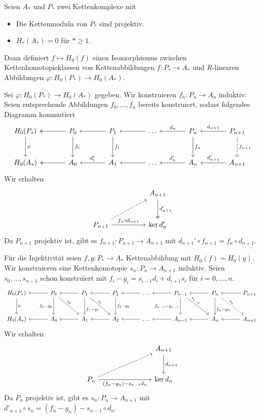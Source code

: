 \begin{proposition}[label=prop:113]
	Seien $A_*$ und $P_*$ zwei Kettenkomplexe mit 
	\begin{itemize}[itemsep=0pt]
		\item Die Kettenmoduln von $P_*$ sind projektiv.
		\item $H_*(A_*)=0$ für $*\ge 1$.
	\end{itemize}
	Dann definiert $f \mapsto H_0(f)$ einen Isomorphismus zwischen Kettenhomotopieklassen von Kettenabbildungen $f \colon P_* \to A_*$ und $R$-linearen Abbildungen $\varphi \colon H_0(P_*) \to H_0(A_*)$.
\end{proposition}
\begin{beweis}
	Sei $\varphi \colon H_0(P_*) \to H_0(A_*)$ gegeben. 
	Wir konstruieren $f_n \colon P_n \to A_n$ induktiv: 
	Seien entsprechende Abbildungen $f_0,\ldots ,f_n$ bereits konstruiert, sodass folgendes Diagramm kommutiert
	\[
		\begin{tikzcd}[sep=large]
			H_0(P_*) \dar["\varphi"] & P_0 \lar[two heads]  \dar["f_0"]& P_1 \lar  \dar["f_1"]& \ldots \lar & P_n \lar["d_n"']\dar["f_n"] & P_{n+1} \lar["d_{n+1}"'] \dar[dashed,"f_{n+1}"] \\
			H_0(A_*) & A_0 \lar[two heads] & A_1 \lar["d_1'"'] & \ldots \lar & A_n \lar["d_n'"'] & A_{n+1} \lar["d_{n+1}'"']
		\end{tikzcd}
	\]
	Wir erhalten 
	\[
		\begin{tikzcd}[row sep=large, column sep=huge]
			\mbox{ } & A_{n+1} \dar[two heads,"d_{n+1}'"]\\
			P_{n+1} \ar[ur,dashed] \rar["f_n \circ d_{n+1}"] & \ker d_{n}'
		\end{tikzcd}
	\]
	Da $P_{n+1}$ projektiv ist, gibt es $f_{n+1} \colon P_{n+1} \to A_{n+1}$ mit $d_{n+1}' \circ f_{n+1} = f_n \circ d_{n+1}$.
	
	Für die Injektivität seien $f,g \colon P_* \to A_*$ Kettenabbildung mit $H_0(f) = H_0(g)$. 
	Wir konstruieren eine Kettenhomotopie $s_n \colon P_n \to A_{n+1}$ induktiv. Seien $s_0, \ldots ,s_{n-1}$ schon konstruiert mit $f_i -g_i= s_{i-1} d_i + d_{i+1} s_i$ für $i=0, \ldots , n$.
	\[
		\begin{tikzcd}[row sep=large, column sep=3.15em]
			H_0(P_*) \dar["0"] & P_0 \lar \dar["f_0-g_0"'] \drar[sloped,pos=.4,"s_0"] & P_1 \lar \dar[pos=.7,"f_1-g_1"] \drar[sloped,pos=.4,"s_1"] & P_2 \lar \dar["f_2 - g_2"] & \ldots \lar & P_{n-1} \lar\dar["f_{n-1}- g_{n-1}"'] \drar[sloped,pos=.3,"s_{n-1}"] & P_n \lar \dar[pos=.7,"f_n - g_n"]  \drar[dashed,sloped,pos=.4,"s_n"] & P_{n+1} \lar \\
			H_0(A_*) & A_0 \lar & A_1 \lar & A_2 \lar & \ldots \lar & A_{n-1} \lar & A_n \lar & A_{n+1} \lar 
		\end{tikzcd}
	\]
	Wir erhalten
	\[
		\begin{tikzcd}[row sep=large, column sep=7.5em]
			\mbox{} &  A_{n+1} \dar["d_{n+1}"] \\
			P_n \rar["(f_n-g_n)- s_{n-1} d_n"'] \urar[dashed] &\ker d_n
		\end{tikzcd}
	\]
	Da $P_n$ projektiv ist, gibt es $s_n \colon P_n \to A_{n+1}$ mit $d'_{n+1} \circ s_n = (f_n -g_n) - s_{n-1} \circ d_n$.
\end{beweis}

